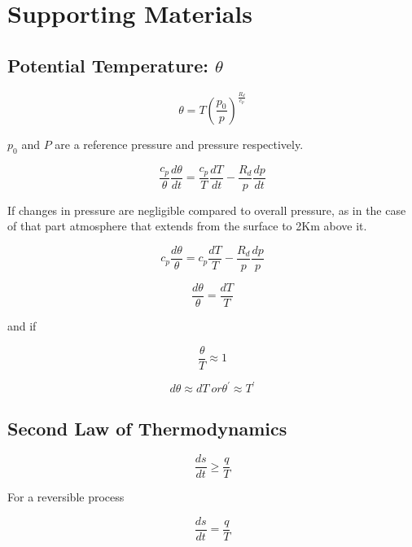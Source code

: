 \chapter{Supporting Materials}

\section{Potential Temperature: $\theta$}
\label{sec:pottemp}
\begin{equation}
\theta = T \left(\frac{p_{0}}{p} \right)^{\frac{R_{d}}{c_{p}}} 
\end{equation}

$p_{0}$ and $P$ are a reference pressure and pressure respectively. 

\begin{equation}
\frac{c_{p}}{\theta}\frac{d\theta}{dt} = \frac{c_{p}}{T} \frac{dT}{dt} - \frac{R_{d}}{p}\frac{dp}{dt} 
\end{equation}

If changes in pressure are negligible compared to overall pressure, as in the case of that part atmosphere that extends from the surface to 2Km above it. 

\begin{equation}
c_{p}\frac{d\theta}{\theta} = c_{p}\frac{dT}{T} - \frac{R_{d}}{p}\frac{dp}{p} 
\end{equation}

\begin{equation}
\frac{d\theta}{\theta} = \frac{dT}{T} 
\end{equation}

and if 

\begin{equation}
\frac{\theta}{T} \approx 1 
\end{equation}

\begin{equation}
d\theta \approx dT \ or  \theta^{'} \approx T^{'}
\end{equation}

\section{Second Law of Thermodynamics}
\begin{equation}
\frac{ds}{dt} \ge \frac{q}{T}
\end{equation}

For a reversible process

\begin{equation}
\frac{ds}{dt} = \frac{q}{T}
\end{equation}


